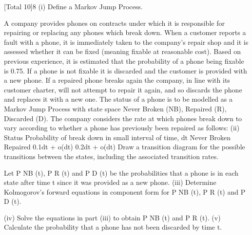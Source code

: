 [Total 10]8
(i)
Define a Markov Jump Process.

A company provides phones on contracts under which it is responsible for repairing
or replacing any phones which break down.
When a customer reports a fault with a phone, it is immediately taken to the
company’s repair shop and it is assessed whether it can be fixed (meaning fixable at
reasonable cost). Based on previous experience, it is estimated that the probability of
a phone being fixable is 0.75. If a phone is not fixable it is discarded and the
customer is provided with a new phone.
If a repaired phone breaks again the company, in line with its customer charter, will
not attempt to repair it again, and so discards the phone and replaces it with a new
one.
The status of a phone is to be modelled as a Markov Jump Process with state space
{Never Broken (NB), Repaired (R), Discarded (D)}.
The company considers the rate at which phones break down to vary according to
whether a phone has previously been repaired as follows:
(ii)
Status Probability of break down in small
interval of time, dt
Never Broken
Repaired 0.1dt + o(dt)
0.2dt + o(dt)
Draw a transition diagram for the possible transitions between the states,
including the associated transition rates.

Let P NB (t), P R (t) and P D (t) be the probabilities that a phone is in each state after time t
since it was provided as a new phone.
(iii) Determine Kolmogorov’s forward equations in component form for P NB (t),
P R (t) and P D (t).

(iv) Solve the equations in part (iii) to obtain P NB (t) and P R (t).
(v) Calculate the probability that a phone has not been discarded by time t.

